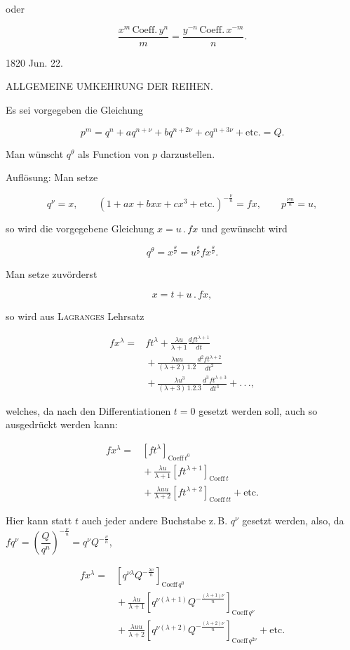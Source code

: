 \noindent oder

\[
\frac{x^m\,\text{Coeff.}\,y^n}{m} = \frac{y^{-n}\,\text{Coeff.}\,x^{-m}}{n}.
\]

1820 Jun. 22.



\begin{center}
ALLGEMEINE UMKEHRUNG DER REIHEN.
\end{center}

\noindent\hspace*{\parindent}Es sei vorgegeben die Gleichung

\[
p^m = q^n+aq^{n+\nu}+bq^{n+2\nu}+cq^{n+3\nu}+\text{etc.} = Q.
\]

\noindent Man w\"unscht $q^\theta$ als Function von $p$ darzustellen.

Aufl\"osung: Man setze

\[
q^\nu = x,\qquad (1+ax+bxx+cx^3+\text{etc.})^{-\frac{\nu}{n}} = fx,\qquad p^{\frac{\nu m}{n}} = u,
\]

\noindent so wird die vorgegebene Gleichung $x = u\,.\,fx$ und gew\"unscht wird

\[
q^\theta = x^{\frac{\theta}{\nu}} = u^{\frac{\theta}{\nu}}fx^{\frac{\theta}{\nu}}.
\]

Man setze zuv\"orderst

\[
x = t+u\,.\,fx,
\]

\noindent so wird aus \textsc{Lagranges} Lehrsatz

\[
\begin{aligned}fx^\lambda ={}& ft^\lambda + \frac{\lambda u}{\lambda+1}\frac{dft^{\lambda+1}}{dt} \\ &{}+ \frac{\lambda uu}{(\lambda+2)\,1.2}\frac{d^2ft^{\lambda+2}}{dt^2} \\ &{}+ \frac{\lambda u^3}{(\lambda+3)\,1.2.3}\frac{d^3ft^{\lambda+3}}{dt^3}+.\,.\,.,
\end{aligned}
\]

\noindent welches, da nach den Differentiationen $t=0$ gesetzt werden soll, auch so ausgedr\"uckt werden kann:

\[
\begin{aligned}fx^\lambda ={}& [ft^\lambda]_{\text{Coeff}\,t^0}\\ &{}+ \frac{\lambda u}{\lambda+1}[ft^{\lambda+1}]_{\text{Coeff}\,t}\\ &{}+ \frac{\lambda uu}{\lambda+2}[ft^{\lambda+2}]_{\text{Coeff}\,tt}+\text{etc.}
\end{aligned}
\]

Hier kann statt $t$ auch jeder andere Buchstabe z.\,B. $q^\nu$ gesetzt werden, also, da $fq^\nu = \left(\dfrac{Q}{q^n}\right)^{-\frac{\nu}{n}} = q^\nu Q^{-\frac{\nu}{n}}$,

\[
\begin{aligned}fx^\lambda ={}& \left[q^{\nu\lambda}Q^{-\frac{\lambda\nu}{n}}\right]_{\text{Coeff}\,q^0}\\ &{}+ \frac{\lambda u}{\lambda+1}\left[q^{\nu(\lambda+1)}Q^{-\frac{(\lambda+1)\nu}{n}}\right]_{\text{Coeff}\,q^\nu}\\ &{}+ \frac{\lambda uu}{\lambda+2}\left[q^{\nu(\lambda+2)}Q^{-\frac{(\lambda+2)\nu}{n}}\right]_{\text{Coeff}\,q^{2\nu}}+\text{etc.}
\end{aligned}
\]

